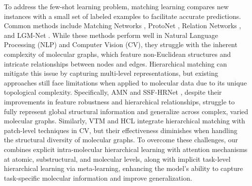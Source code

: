 To address the few-shot learning problem, matching learning compares new instances with a small set of labeled examples to facilitate accurate predictions.
Common methods include Matching Networks \citep{vinyals2016matching}, ProtoNet \citep{snell2017prototypical}, Relation Networks \citep{sung2018learning}, and LGM-Net \citep{li2019lgm}.
While these methods perform well in Natural Language Processing (NLP) and Computer Vision (CV), they struggle with the inherent complexity of molecular graphs, which feature non-Euclidean structures and intricate relationships between nodes and edges. Hierarchical matching can mitigate this issue by capturing multi-level representations, but existing approaches still face limitations when applied to molecular data due to its unique topological complexity.
Specifically, 
AMN \citep{mai2019attentive} and SSF-HRNet \citep{zhong2023self}, despite their improvements in feature robustness and hierarchical relationships, struggle to fully represent global structural information and generalize across complex, varied molecular graphs.
Similarly, VTM \citep{kim2023universal} and HCL \citep{zheng2022few} integrate hierarchical matching with patch-level techniques in CV, but their effectiveness diminishes when handling the structural diversity of molecular graphs.
To overcome these challenges, our \method combines explicit intra-molecular hierarchical learning with attention mechanisms at atomic, substructural, and molecular levels, along with implicit task-level hierarchical learning via meta-learning, enhancing the model’s ability to capture task-specific molecular information and improve generalization.